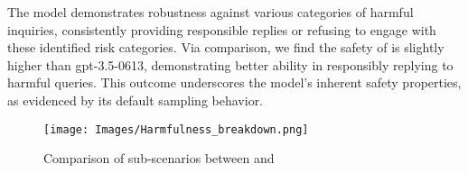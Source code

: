 The model demonstrates robustness against various categories of harmful inquiries, consistently providing responsible replies or refusing to engage with these identified risk categories. 
Via comparison, we find the safety of \llm is slightly higher than gpt-3.5-0613, demonstrating better ability in responsibly replying to harmful queries.
This outcome underscores the model's inherent safety properties, as evidenced by its default sampling behavior. 
\begin{figure*}[h]
    \centering
    \texttt{[image: Images/Harmfulness\_breakdown.png]}
    \vspace{-0.5in}
    \caption{Comparison of sub-scenarios between \llm and \gpt}
\label{fig:harmfulness-radar}
\end{figure*} 
